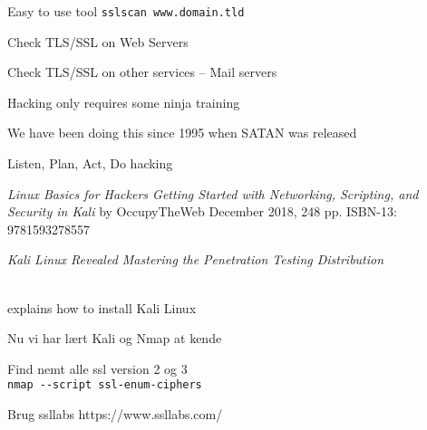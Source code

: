 \documentclass[Screen16to9,17pt]{foils}
\begin{document}

\begin{list2}
\item Easy to use tool \verb+sslscan www.domain.tld+
\item Check TLS/SSL on Web Servers
\item Check TLS/SSL on other services -- Mail servers
\end{list2}



\begin{list2}
\item Hacking only requires some ninja training
\item We have been doing this since 1995 when SATAN was released
\item Listen, Plan, Act, Do hacking
\end{list2}



\emph{Linux Basics for Hackers
Getting Started with Networking, Scripting, and Security in Kali}
by OccupyTheWeb
December 2018, 248 pp.
ISBN-13:
9781593278557




\emph{Kali Linux Revealed  Mastering the Penetration Testing Distribution}

\\
explains how to install Kali Linux






\begin{list1}
\item Nu vi har lært Kali og Nmap at kende
\begin{list2}
\item Find nemt alle ssl version 2 og 3\\
\verb+nmap --script ssl-enum-ciphers+
\item Brug ssllabs https://www.ssllabs.com/
\end{list2}
\end{list1}
\end{document}
